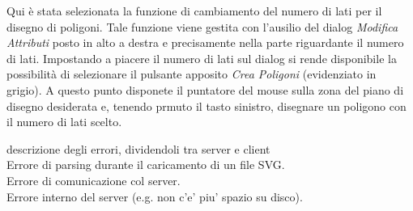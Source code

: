 \vspace{100pt}
Qui \`e stata selezionata la funzione di cambiamento del numero di lati per il disegno di poligoni. Tale funzione viene gestita con l'ausilio del dialog \textit{Modifica Attributi} posto in alto a destra e precisamente nella parte riguardante il numero di lati. Impostando a piacere il numero di lati sul dialog si rende disponibile la possibilit\`a di selezionare il pulsante apposito \textit{Crea Poligoni} (evidenziato in grigio). A questo punto disponete il puntatore del mouse sulla zona del piano di disegno desiderata e, tenendo prmuto il tasto sinistro, disegnare un poligono con il numero di lati scelto.  


descrizione degli errori, dividendoli tra server e client\\
Errore di parsing durante il caricamento di un file SVG.\\
Errore di comunicazione col server. \\
Errore interno del server (e.g. non c'e' piu' spazio su disco).\\


